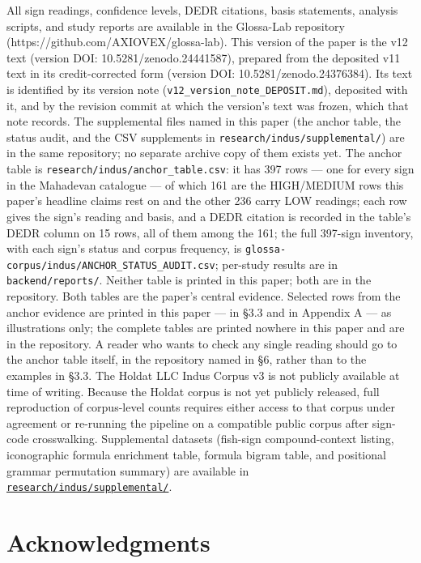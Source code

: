 \documentclass[11pt]{article}
\begin{document}
All sign readings, confidence levels, DEDR citations, basis statements, analysis scripts, and study reports are available in the Glossa-Lab repository (https://github.com/AXIOVEX/glossa-lab). This version of the paper is the v12 text (version DOI: 10.5281/zenodo.24441587), prepared from the deposited v11 text in its credit-corrected form (version DOI: 10.5281/zenodo.24376384). Its text is identified by its version note (\texttt{v12\_version\_note\_DEPOSIT.md}), deposited with it, and by the revision commit at which the version's text was frozen, which that note records. The supplemental files named in this paper (the anchor table, the status audit, and the CSV supplements in \texttt{research/indus/supplemental/}) are in the same repository; no separate archive copy of them exists yet. The anchor table is \texttt{research/\allowbreak indus/\allowbreak anchor\_table.csv}: it has 397 rows --- one for every sign in the Mahadevan catalogue --- of which 161 are the HIGH/MEDIUM rows this paper's headline claims rest on and the other 236 carry LOW readings; each row gives the sign's reading and basis, and a DEDR citation is recorded in the table's DEDR column on 15 rows, all of them among the 161; the full 397-sign inventory, with each sign's status and corpus frequency, is \texttt{glossa-corpus/\allowbreak indus/\allowbreak ANCHOR\_STATUS\_AUDIT.csv}; per-study results are in \texttt{backend/\allowbreak reports/}. Neither table is printed in this paper; both are in the repository. Both tables are the paper's central evidence. Selected rows from the anchor evidence are printed in this paper --- in §3.3 and in Appendix A --- as illustrations only; the complete tables are printed nowhere in this paper and are in the repository. A reader who wants to check any single reading should go to the anchor table itself, in the repository named in §6, rather than to the examples in §3.3. The Holdat LLC Indus Corpus v3 is not publicly available at time of writing. Because the Holdat corpus is not yet publicly released, full reproduction of corpus-level counts requires either access to that corpus under agreement or re-running the pipeline on a compatible public corpus after sign-code crosswalking. Supplemental datasets (fish-sign compound-context listing, iconographic formula enrichment table, formula bigram table, and positional grammar permutation summary) are available in \href{https://github.com/AXIOVEX/glossa-lab/tree/main/research/indus/supplemental}{\texttt{research/\allowbreak indus/\allowbreak supplemental/}}.

\section{Acknowledgments}\label{acknowledgments}
\end{document}
